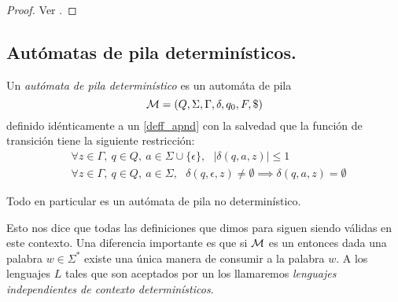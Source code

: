 \documentclass[tesis.tex]{subfiles}
\begin{document}
\begin{proof}
	Ver \cite[pp. 245-246, 248-250]{hopcraft-ullman}.
\end{proof}


\subsection{Autómatas de pila determinísticos.} 
\begin{deff}
	Un \emph{autómata de pila determinístico} es un automáta de pila 
	\[
	{\cal M } = (Q, \Sigma, \Gamma, \delta, q_0, F, \$)
	\]
	definido idénticamente a un \APND \ref{deff_apnd} con la salvedad que la función de transición tiene la siguiente restricción:
	\begin{align*}
		&\forall z \in \Gamma, \ q \in Q, \ a \in \Sigma \cup \{ \epsilon \}, \ \ \  |\delta(q,a, z)| \le 1   \\
		&\forall z \in \Gamma, \ q \in Q, \ a \in \Sigma, \ \ \ 
		\delta(q,\epsilon,z) \neq \emptyset \implies \delta(q,a,z) = \emptyset
	\end{align*}
	
	
\end{deff}

\begin{obs}
	Todo \APD en particular es un autómata de pila no determinístico. 
\end{obs}

Esto nos dice que todas las definiciones que dimos para \APND siguen siendo válidas en este contexto.
Una diferencia importante es que si ${\cal M }$ es un \APD entonces dada una palabra $w \in \Sigma^*$ existe una única manera de consumir a la palabra $w$.
A los lenguajes $L$ tales que son aceptados por un \APD los llamaremos \emph{lenguajes independientes de contexto determinísticos}.


%
\end{document}
